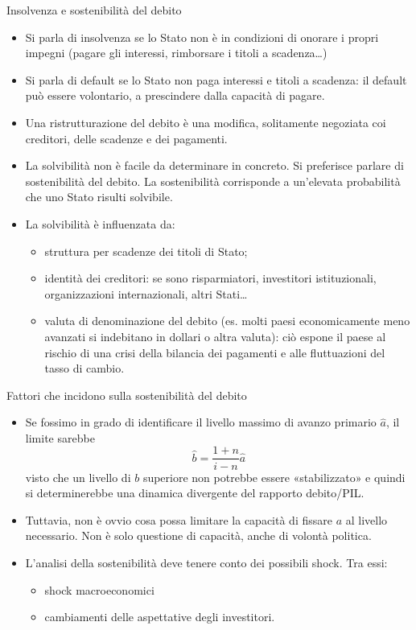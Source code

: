 \documentclass[aspectratio=149,11pt,italian]{beamer}
\begin{document}
\begin{frame}{Insolvenza e sostenibilità del debito}
\begin{itemize}
\item Si parla di \alert{insolvenza} se lo Stato non è in condizioni di onorare i propri
impegni (pagare gli interessi, rimborsare i titoli a scadenza\ldots{})
\item Si parla di \alert{default} se lo Stato non paga interessi e titoli a scadenza: il
default può essere volontario, a prescindere dalla capacità di pagare.
\item Una \alert{ristrutturazione} del debito è una modifica, solitamente negoziata coi
creditori, delle scadenze e dei pagamenti.
\item La \alert{solvibilità} non è facile da determinare in concreto. Si preferisce
parlare di \alert{sostenibilità} del debito. La sostenibilità corrisponde a
un'elevata probabilità che uno Stato risulti solvibile.
\item La solvibilità è influenzata da:
\begin{itemize}
\item struttura per scadenze dei titoli di Stato;
\item identità dei creditori: se sono risparmiatori, investitori istituzionali,
organizzazioni internazionali, altri Stati\ldots{}
\item valuta di denominazione del debito (es. molti paesi economicamente meno
avanzati si indebitano in dollari o altra valuta): ciò espone il paese al
rischio di una crisi della bilancia dei pagamenti e alle fluttuazioni del
tasso di cambio.
\end{itemize}
\end{itemize}
\end{frame}
\begin{frame}{Fattori che incidono sulla sostenibilità del debito}
\begin{itemize}
\item Se fossimo in grado di identificare il livello massimo di avanzo primario
\(\hat a\), il limite sarebbe
\begin{equation*}
  \hat{b}=\frac{1+n}{i-n}\hat{a}
\end{equation*}
visto che un
livello di \(b\) superiore non potrebbe essere «stabilizzato» e quindi si
determinerebbe una dinamica divergente del rapporto debito/PIL.

\item Tuttavia, non è ovvio cosa possa limitare la capacità di fissare \(a\) al
livello necessario. Non è solo questione di capacità, anche di volontà
politica.

\item L'analisi della sostenibilità deve tenere conto dei possibili shock. Tra
essi:
\begin{itemize}
\item shock macroeconomici
\item cambiamenti delle aspettative degli investitori.
\end{itemize}
\end{itemize}
\end{frame}
\end{document}
